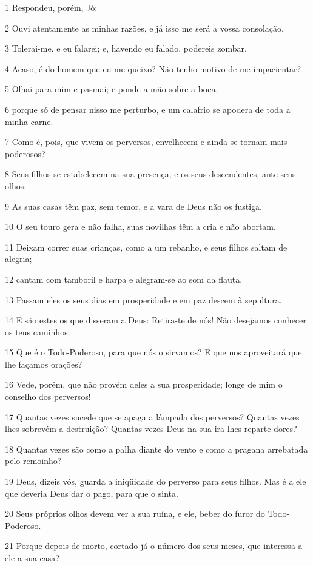 \par 1 Respondeu, porém, Jó:
\par 2 Ouvi atentamente as minhas razões, e já isso me será a vossa consolação.
\par 3 Tolerai-me, e eu falarei; e, havendo eu falado, podereis zombar.
\par 4 Acaso, é do homem que eu me queixo? Não tenho motivo de me impacientar?
\par 5 Olhai para mim e pasmai; e ponde a mão sobre a boca;
\par 6 porque só de pensar nisso me perturbo, e um calafrio se apodera de toda a minha carne.
\par 7 Como é, pois, que vivem os perversos, envelhecem e ainda se tornam mais poderosos?
\par 8 Seus filhos se estabelecem na sua presença; e os seus descendentes, ante seus olhos.
\par 9 As suas casas têm paz, sem temor, e a vara de Deus não os fustiga.
\par 10 O seu touro gera e não falha, suas novilhas têm a cria e não abortam.
\par 11 Deixam correr suas crianças, como a um rebanho, e seus filhos saltam de alegria;
\par 12 cantam com tamboril e harpa e alegram-se ao som da flauta.
\par 13 Passam eles os seus dias em prosperidade e em paz descem à sepultura.
\par 14 E são estes os que disseram a Deus: Retira-te de nós! Não desejamos conhecer os teus caminhos.
\par 15 Que é o Todo-Poderoso, para que nós o sirvamos? E que nos aproveitará que lhe façamos orações?
\par 16 Vede, porém, que não provém deles a sua prosperidade; longe de mim o conselho dos perversos!
\par 17 Quantas vezes sucede que se apaga a lâmpada dos perversos? Quantas vezes lhes sobrevém a destruição? Quantas vezes Deus na sua ira lhes reparte dores?
\par 18 Quantas vezes são como a palha diante do vento e como a pragana arrebatada pelo remoinho?
\par 19 Deus, dizeis vós, guarda a iniqüidade do perverso para seus filhos. Mas é a ele que deveria Deus dar o pago, para que o sinta.
\par 20 Seus próprios olhos devem ver a sua ruína, e ele, beber do furor do Todo-Poderoso.
\par 21 Porque depois de morto, cortado já o número dos seus meses, que interessa a ele a sua casa?
